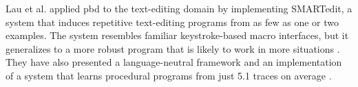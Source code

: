 Lau et al. applied \gls{pbd} to the text-editing domain by implementing
SMARTedit, a system that induces repetitive text-editing programs from as few as
one or two examples. The system resembles familiar keystroke-based macro
interfaces, but it generalizes to a more robust program that is likely to work
in more situations \cite{Lau2003}. They have also presented a language-neutral
framework and an implementation of a system that learns procedural programs from
just 5.1 traces on average \cite{Lau:traces:2003}.
